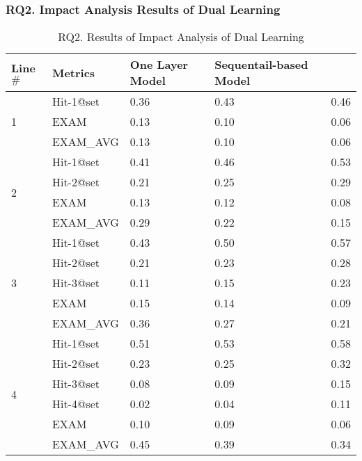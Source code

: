 \subsubsection{\bf RQ2. Impact Analysis Results of Dual Learning}

\iffalse

\begin{table}[b]
	\caption{RQ2. Results of Impact Analysis of Dual Learning}
        \vspace{-12pt}
	{\footnotesize
		\begin{center}
			\renewcommand{\arraystretch}{1}
			\begin{tabular}{p{1cm}<{\centering}|p{1.5cm}<{\centering}|p{1.5cm}<{\centering}|p{1.5cm}<{\centering}|p{1.2cm}<{\centering}}
				\hline
				Line$\#$ & Metrics & One Layer Model & Sequentail-based Model & \tool \\
				\hline
				\multirow{3}{*}{1}  & Hit-1@set     & 0.36 & 0.43 & 0.46  \\
									& EXAM          & 0.13 & 0.10 & 0.06  \\
									& EXAM\_AVG     & 0.13 & 0.10 & 0.06  \\
				\hline
				\multirow{4}{*}{2}  & Hit-1@set     & 0.41 & 0.46 & 0.53  \\
									& Hit-2@set     & 0.21 & 0.25 & 0.29  \\
									& EXAM          & 0.13 & 0.12 & 0.08  \\
									& EXAM\_AVG     & 0.29 & 0.22 & 0.15 \\
				\hline
				\multirow{5}{*}{3}  & Hit-1@set     & 0.43 & 0.50 & 0.57 \\
									& Hit-2@set     & 0.21 & 0.23 & 0.28 \\
									& Hit-3@set     & 0.11 & 0.15 & 0.23 \\
									& EXAM          & 0.15 & 0.14 & 0.09 \\
									& EXAM\_AVG     & 0.36 & 0.27 & 0.21 \\
				\hline
				\multirow{6}{*}{4}  & Hit-1@set     & 0.51 & 0.53 & 0.58 \\
									& Hit-2@set     & 0.23 & 0.25 & 0.32 \\
									& Hit-3@set     & 0.08 & 0.09 & 0.15 \\
									& Hit-4@set     & 0.02 & 0.04 & 0.11 \\
									& EXAM          & 0.10 & 0.09 & 0.06 \\
									& EXAM\_AVG     & 0.45 & 0.39 & 0.34 \\

\end{tabular}
\end{center}}
\end{table}
